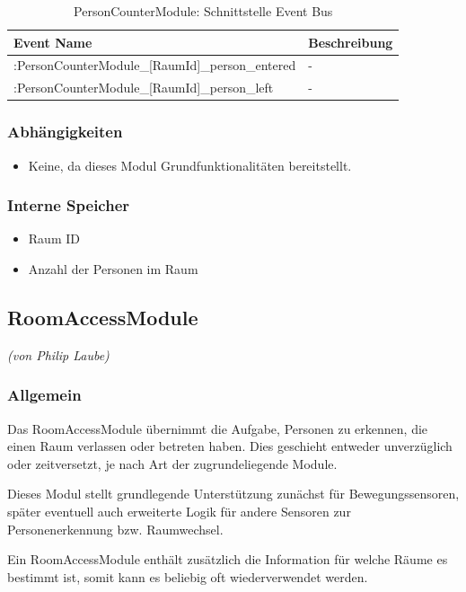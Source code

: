 \begin{table}[H]
	\begin{tabularx}{\textwidth}{
			>{\hsize=1.5\hsize}X 
			>{\hsize=0.5\hsize}X
		}
		\hline
		\textbf{Event Name}													& \textbf{Beschreibung} \\
		\hline [DeviceId]:PersonCounterModule\_[RaumId]\_person\_entered	& - \\ 
		\hline [DeviceId]:PersonCounterModule\_[RaumId]\_person\_left		& - \\
		\hline
	\end{tabularx}
	\caption{PersonCounterModule: Schnittstelle Event Bus}
\end{table}

\subsubsection{Abhängigkeiten}
\begin{itemize}
	\item Keine, da dieses Modul Grundfunktionalitäten bereitstellt.
\end{itemize}

\subsubsection{Interne Speicher}
\begin{itemize}
	\item Raum ID
	\item Anzahl der Personen im Raum
\end{itemize}


\subsection{RoomAccessModule}
\emph{(von Philip Laube)}

\subsubsection{Allgemein}
Das RoomAccessModule übernimmt die Aufgabe, Personen zu erkennen, die einen Raum verlassen oder betreten haben. Dies geschieht entweder unverzüglich oder zeitversetzt, je nach Art der zugrundeliegende Module.

Dieses Modul stellt grundlegende Unterstützung zunächst für Bewegungssensoren, später eventuell auch erweiterte Logik für andere Sensoren zur Personenerkennung bzw. Raumwechsel.

Ein RoomAccessModule enthält zusätzlich die Information für welche Räume es bestimmt ist, somit kann es beliebig oft wiederverwendet werden.

